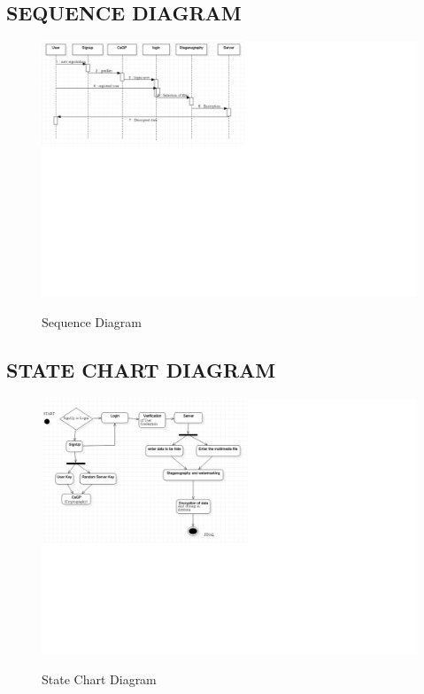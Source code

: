    \pagebreak 
    \subsection*{SEQUENCE DIAGRAM}
    
    \begin{figure}[H]
  
  \centering
  \includegraphics[scale=0.8]{sequence.png}\\
  \caption{Sequence Diagram}
  
  
\end{figure}
 \pagebreak   
    \subsection*{STATE CHART DIAGRAM}
    
    \begin{figure}[H]
  \centering
  \includegraphics[scale=0.65]{State.png}\\
  \caption{State Chart Diagram}
  
\end{figure}
\pagebreak
